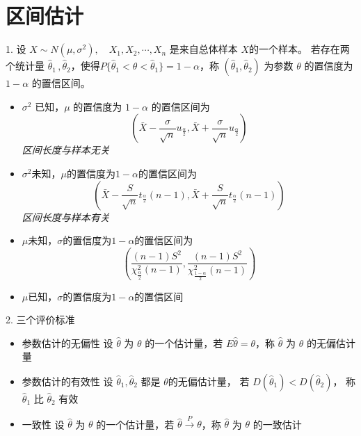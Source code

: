 \section{区间估计}
\label{sec:区间估计}

1. 设 $X \sim N(\mu, \sigma^2), \quad X_1, X_2, \cdots, X_n$ 是来自总体样本 $X$的一个样本。
若存在两个统计量 $\hat{\theta}_1\,,\hat{\theta}_2$，使得$P\{ \hat{\theta}_1 < \theta < \hat{\theta}_1\} = 1-\alpha$，称 $\left(\hat{\theta}_1,\hat{\theta}_2\right)$ 为参数 $\theta$ 的置信度为 $1-\alpha$ 的置信区间。
\begin{itemize}
    \item $\sigma^2$ 已知，$\mu$ 的置信度为 $1-\alpha$ 的置信区间为
    \[
        \left(\bar{X} - \frac{\sigma}{\sqrt{n}} u_{\frac{\alpha}{2}},
        \bar{X} + \frac{\sigma}{\sqrt{n}} u_{\frac{\alpha}{2}}\right)
    \]
    \emph{ 区间长度与样本无关 }
    \item $\sigma^2$未知，$\mu$的置信度为$1-\alpha$的置信区间为
    \[
        \left(\bar{X} - \frac{S}{\sqrt{n}} t_{\frac{\alpha}{2}}(n-1), \bar{X} + \frac{S}{\sqrt{n}} t_{\frac{\alpha}{2}}(n-1)\right)
    \]
    \emph{ 区间长度与样本有关 }
    \item $\mu$未知，$\sigma$的置信度为$1-\alpha$的置信区间为
    \[
        \left(\frac{(n-1)S^2}{\chi_{\frac{\alpha}{2}}^2(n-1)}, \frac{(n-1)S^2}{\chi_{\frac{1-\alpha}{2}}^2(n-1)}\right)
    \]
    \item $\mu$已知，$\sigma$的置信度为$1-\alpha$的置信区间
\end{itemize}

2. 三个评价标准

\begin{itemize}
    \item 参数估计的无偏性
    设 $\hat{\theta}$ 为 $\theta$ 的一个估计量，若 $E\hat{\theta} = \theta$，称 $\hat{\theta}$ 为 $\theta$ 的无偏估计量
    \item 参数估计的有效性
    设 $\hat{\theta}_1, \hat{\theta}_2$ 都是 $\theta$的无偏估计量， 若 $D(\hat{\theta}_1) < D(\hat{\theta}_2)$， 称 $\hat{\theta}_1$ 比 $\hat{\theta}_2$ 有效
    \item 一致性
    设 $\hat{\theta}$ 为 $\theta$ 的一个估计量，若 $\hat{\theta} \stackrel{P}{\longrightarrow} \theta$，称 $\hat{\theta}$ 为 $\theta$ 的一致估计
\end{itemize}

